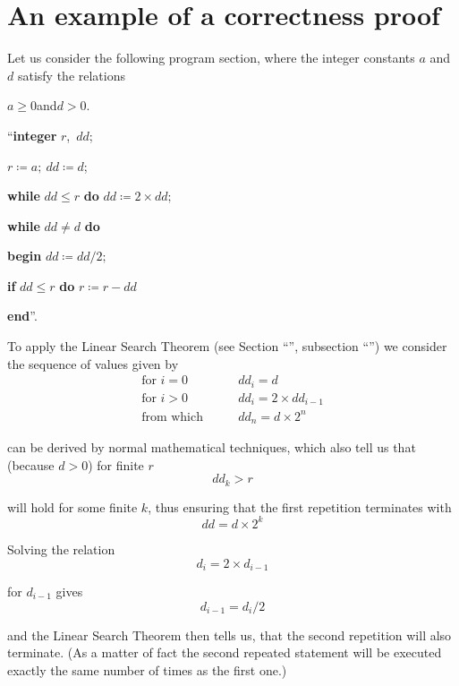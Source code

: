 \section{An example of a correctness proof}

Let us consider the following program section, where the integer constants $a$ and $d$ satisfy the relations
\medskip

{
	\setlength{\parindent}{8em}
	$a \geqslant 0$\quad and\quad $d > 0$.
	
	\hspace{-.4em}``\textbf{integer} $r$,\ $dd$;
	
	$r \coloneq a;\ dd \coloneq d$;
	
	\textbf{while} $dd \leqslant r$ \textbf{do} $dd \coloneq 2\times dd;$
	
	\textbf{while} $dd \neq d$ \textbf{do}
	
	\quad \textbf{begin} $dd \coloneq dd/2;$
	
	\quad\quad \textbf{if} $dd \leqslant r$ \textbf{do} $r \coloneq r - dd$
	
	\quad\textbf{end}''.
}
\medskip

To apply the Linear Search Theorem (see Section ``'', subsection ``'') we consider the sequence of values given by
\begin{equation}
	\label{eq:example-initial}
	\begin{split}
		\text{for } i = 0\qquad & dd_i = d \\
		\text{for } i > 0\qquad & dd_i = 2\times dd_{i - 1}\\
		\text{from which}\qquad & dd_n = d\times 2^n
	\end{split}
\end{equation}


\noindent
can be derived by normal mathematical techniques, which also tell us that (because $d > 0$) for finite $r$
$$
dd_k > r
$$

\noindent
will hold for some finite $k$, thus ensuring that the first repetition terminates with
$$
dd = d\times 2^k
$$

Solving the relation
$$
d_i = 2\times d_{i-1}
$$

\noindent
for $d_{i-1}$ gives
$$
d_{i-1} = d_i/2
$$

\noindent
and the Linear Search Theorem then tells us, that the second repetition will also terminate. (As a matter of fact the second repeated statement will be executed exactly the same number of times as the first one.)

